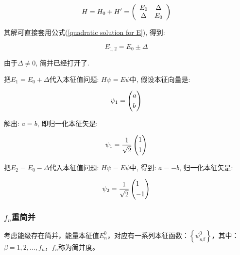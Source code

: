 \begin{equation}\label{degenerate two state perturbation}
H=H_0 + H'= \left( {\begin{array}{*{20}c}
   E_0 & \Delta  \\
   \Delta & E_0  \\
\end{array} } \right)
\end{equation}

其解可直接套用公式(\ref{quadratic solution for E}), 得到:

\begin{equation*}
E_{1,2}=E_0 \pm \Delta
\end{equation*}

由于$\Delta \ne 0$, 简并已经打开了.

把$E_1 = E_0 +\Delta$代入本征值问题: $H\psi = E\psi$中,
假设本征向量是:

\begin{equation*}
\psi_1 = \left( \begin{gathered}
  a \hfill \\
  b \hfill \\
\end{gathered}  \right)
\end{equation*}

解出: $a = b$, 即归一化本征矢是:

\begin{equation*}
\psi_1 = \frac{1}{\sqrt{2}} \left( \begin{gathered}
  1 \hfill \\
  1 \hfill \\
\end{gathered}  \right)
\end{equation*}

把$E_2 = E_0 -\Delta$代入本征值问题: $H\psi = E\psi$中, 得到:
$a=-b$, 归一化本征矢是:

\begin{equation*}
\psi_2 = \frac{1}{\sqrt{2}} \left( \begin{gathered}
  1 \hfill \\
  -1 \hfill \\
\end{gathered}  \right)
\end{equation*}


\subsubsection{$f_n$重简并}

考虑能级存在简并，能量本征值$E_n^0 $，对应有一系列本征函数：$\left\{ {\psi _{n\beta }^0 } \right\}$，其中：$\beta  = 1,2,...,f_n $，$f_n$称为简并度。

